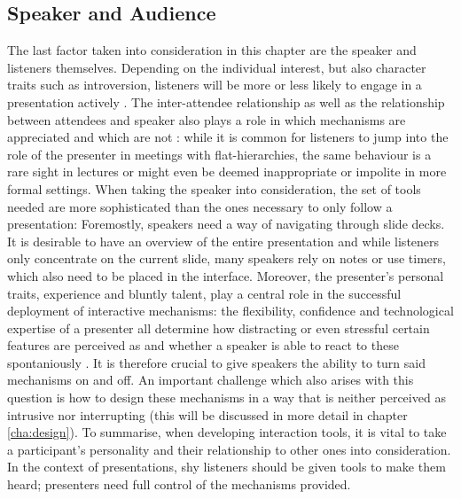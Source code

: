 
\subsection{Speaker and Audience}
The last factor taken into consideration in this chapter are the speaker and listeners themselves. Depending on the individual interest, but also character traits such as introversion, listeners will be more or less likely to engage in a presentation actively \cite{Bry:Backstage}. The inter-attendee relationship as well as the relationship between attendees and speaker also plays a role in which mechanisms are appreciated and which are not \cite{Moore:ThreeTypesOfInteraction}: while it is common for listeners to jump into the role of the presenter in meetings with flat-hierarchies, the same behaviour is a rare sight in lectures or might even be deemed inappropriate or impolite in more formal settings. When taking the speaker into consideration, the set of tools needed are more sophisticated than the ones necessary to only follow a presentation: Foremostly, speakers need a way of navigating through slide decks. It is desirable to have an overview of the entire presentation and while listeners only concentrate on the current slide, many speakers rely on notes or use timers, which also need to be placed in the interface.
Moreover, the presenter's personal traits, experience and bluntly talent, play a central role in the successful deployment of interactive mechanisms: the flexibility, confidence and technological expertise of a presenter all determine how distracting or even stressful certain features are perceived as and whether a speaker is able to react to these spontaniously \cite{Wacker:PresenterExperience}. It is therefore crucial to give speakers the ability to turn said mechanisms on and off. An important challenge which also arises with this question is how to design these mechanisms in a way that is neither perceived as intrusive nor interrupting (this will be discussed in more detail in chapter \ref{cha:design}).
To summarise, when developing interaction tools, it is vital to take a participant's personality and their relationship to other ones into consideration. In the context of presentations, shy listeners should be given tools to make them heard; presenters need full control of the mechanisms provided.

